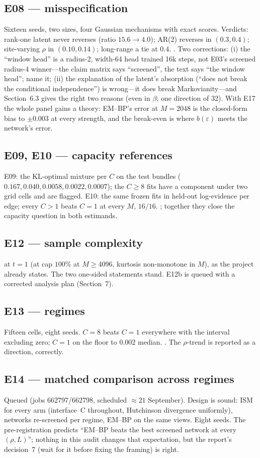 \subsection{E08 --- misspecification}
Sixteen seeds, two sizes, four Gaussian mechanisms with exact scores. Verdicts: rank-one latent never reverses (ratio $15.6\to4.0$); AR(2) reverses in $(0.3,0.4)$; site-varying $\rho$ in $(0.10,0.14)$; long-range a tie at $0.4$. . Two corrections: (i) the ``window head'' is a radius-2, width-64 head trained 16k steps, not E03's screened radius-4 winner---the claim matrix says ``screened'', the text says ``the window head''; name it; (ii) the explanation of the latent's absorption (``does not break the conditional independence'') is wrong---it does break Markovianity---and Section~6.3 gives the right two reasons (even in $\beta$; one direction of 32). With E17 the whole panel gains a theory: EM--BP's error at $M=2048$ is the closed-form bias to $\pm0.003$ at every strength, and the break-even is where $b(\varepsilon)$ meets the network's error.

\subsection{E09, E10 --- capacity references}
E09: the KL-optimal mixture per $C$ on the test bundles ($0.167, 0.040, 0.0058, 0.0022, 0.0007$); the $C\ge8$ fits have a component under two grid cells and are flagged. E10: the same frozen fits in held-out log-evidence per edge; every $C>1$ beats $C=1$ at every $M$, $16/16$. ; together they close the capacity question in both estimands.

\subsection{E12 --- sample complexity}
 at $t=1$ (at cap $100\%$ at $M\ge4096$, kurtosis non-monotone in $M$), as the project already states. The two one-sided statements stand. E12b is queued with a corrected analysis plan (Section~7).

\subsection{E13 --- regimes}
Fifteen cells, eight seeds. $C=8$ beats $C=1$ everywhere with the interval excluding zero; $C=1$ on the floor to $0.002$ median. . The $\rho$-trend is reported as a direction, correctly.

\subsection{E14 --- matched comparison across regimes}
Queued (jobs 662797/662798, scheduled $\approx21$ September). Design is sound: ISM for every arm (interface~C throughout, Hutchinson divergence uniformly), networks re-screened per regime, EM--BP on the same views. Eight seeds. The pre-registration predicts ``EM--BP beats the best screened network at every $(\rho,L)$''; nothing in this audit changes that expectation, but the report's decision~7 (wait for it before fixing the framing) is right.
